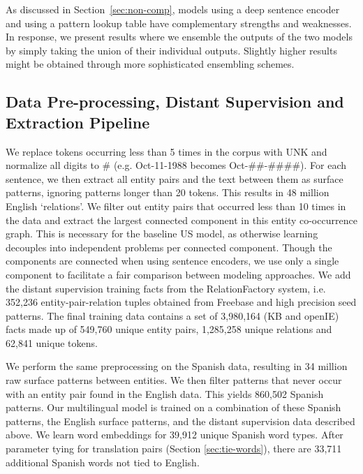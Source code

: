 
As discussed in Section~\ref{sec:non-comp}, models using a deep sentence encoder and using a pattern lookup table have complementary strengths and weaknesses. In response, we present results where we ensemble the outputs of the two models by simply taking the union of their individual outputs. Slightly higher results might be obtained through more sophisticated ensembling schemes. %

\subsection{Data Pre-processing, Distant Supervision and Extraction Pipeline \label{sec:ds-el}}

We replace tokens occurring less than 5 times in the corpus with UNK and normalize all digits to \# (e.g. Oct-11-1988 becomes Oct-\#\#-\#\#\#\#).
For each sentence, we then extract all entity pairs and the text between them as surface patterns, ignoring patterns longer than 20 tokens.
This results in 48 million English `relations'.
We filter out entity pairs that occurred less than 10 times in the data and extract the largest connected component in this entity co-occurrence graph.
This is necessary for the baseline US model, as otherwise learning decouples into independent problems per connected component.
Though the components are connected when using sentence encoders, we use only a single component to facilitate a fair comparison between modeling approaches.
We add the distant supervision training facts from the RelationFactory system, i.e. 352,236 entity-pair-relation tuples obtained from Freebase and high precision seed patterns.
The final training data contains a set of 3,980,164 (KB and openIE) facts made up of 549,760 unique entity pairs, 1,285,258 unique relations and 62,841 unique tokens.

We perform the same preprocessing on the Spanish data, resulting in 34 million raw surface patterns between entities.
We then filter patterns that never occur with an entity pair found in the English data.  This yields 860,502 Spanish patterns.
Our multilingual model is trained on a combination of these Spanish patterns, the English surface patterns, and the distant supervision data described above.
We learn word embeddings for 39,912 unique Spanish word types.
After parameter tying for translation pairs (Section \ref{sec:tie-words}),  there are 33,711 additional Spanish words not tied to English.

